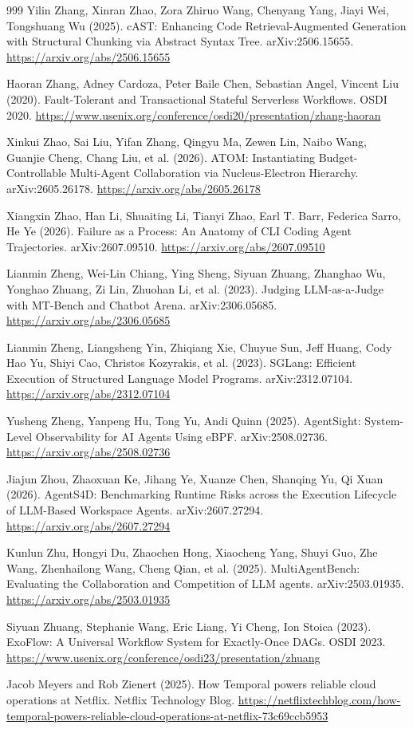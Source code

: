 \begin{thebibliography}{999}
 Yilin Zhang, Xinran Zhao, Zora Zhiruo Wang, Chenyang Yang, Jiayi Wei, Tongshuang Wu (2025). cAST: Enhancing Code Retrieval-Augmented Generation with Structural Chunking via Abstract Syntax Tree. arXiv:2506.15655. \url{https://arxiv.org/abs/2506.15655}

 Haoran Zhang, Adney Cardoza, Peter Baile Chen, Sebastian Angel, Vincent Liu (2020). Fault-Tolerant and Transactional Stateful Serverless Workflows. OSDI 2020. \url{https://www.usenix.org/conference/osdi20/presentation/zhang-haoran}

 Xinkui Zhao, Sai Liu, Yifan Zhang, Qingyu Ma, Zewen Lin, Naibo Wang, Guanjie Cheng, Chang Liu, et al. (2026). ATOM: Instantiating Budget-Controllable Multi-Agent Collaboration via Nucleus-Electron Hierarchy. arXiv:2605.26178. \url{https://arxiv.org/abs/2605.26178}

 Xiangxin Zhao, Han Li, Shuaiting Li, Tianyi Zhao, Earl T. Barr, Federica Sarro, He Ye (2026). Failure as a Process: An Anatomy of CLI Coding Agent Trajectories. arXiv:2607.09510. \url{https://arxiv.org/abs/2607.09510}

 Lianmin Zheng, Wei-Lin Chiang, Ying Sheng, Siyuan Zhuang, Zhanghao Wu, Yonghao Zhuang, Zi Lin, Zhuohan Li, et al. (2023). Judging LLM-as-a-Judge with MT-Bench and Chatbot Arena. arXiv:2306.05685. \url{https://arxiv.org/abs/2306.05685}

 Lianmin Zheng, Liangsheng Yin, Zhiqiang Xie, Chuyue Sun, Jeff Huang, Cody Hao Yu, Shiyi Cao, Christos Kozyrakis, et al. (2023). SGLang: Efficient Execution of Structured Language Model Programs. arXiv:2312.07104. \url{https://arxiv.org/abs/2312.07104}

 Yusheng Zheng, Yanpeng Hu, Tong Yu, Andi Quinn (2025). AgentSight: System-Level Observability for AI Agents Using eBPF. arXiv:2508.02736. \url{https://arxiv.org/abs/2508.02736}

 Jiajun Zhou, Zhaoxuan Ke, Jihang Ye, Xuanze Chen, Shanqing Yu, Qi Xuan (2026). AgentS4D: Benchmarking Runtime Risks across the Execution Lifecycle of LLM-Based Workspace Agents. arXiv:2607.27294. \url{https://arxiv.org/abs/2607.27294}

 Kunlun Zhu, Hongyi Du, Zhaochen Hong, Xiaocheng Yang, Shuyi Guo, Zhe Wang, Zhenhailong Wang, Cheng Qian, et al. (2025). MultiAgentBench: Evaluating the Collaboration and Competition of LLM agents. arXiv:2503.01935. \url{https://arxiv.org/abs/2503.01935}

 Siyuan Zhuang, Stephanie Wang, Eric Liang, Yi Cheng, Ion Stoica (2023). ExoFlow: A Universal Workflow System for Exactly-Once DAGs. OSDI 2023. \url{https://www.usenix.org/conference/osdi23/presentation/zhuang}

 Jacob Meyers and Rob Zienert (2025). How Temporal powers reliable cloud operations at Netflix. Netflix Technology Blog. \url{https://netflixtechblog.com/how-temporal-powers-reliable-cloud-operations-at-netflix-73c69ccb5953}
\end{thebibliography}
